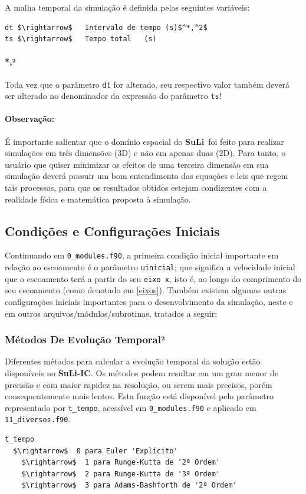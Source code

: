 \documentclass[12pt, a4paper]{article}
\newcommand{\SL}{{\bf SuLi}}
\newcommand{\SLIC}{{\bf SuLi-IC}}
\begin{document}
A malha temporal da simulação é definida pelas seguintes variáveis:
\begin{lstlisting}
dt $\rightarrow$   Intervalo de tempo (s)$^*,^2$
ts $\rightarrow$   Tempo total	 (s)
\end{lstlisting}

\paragraph{*,²} Toda vez que o parâmetro \verb|dt| for alterado, seu respectivo valor também deverá ser alterado no denominador da expressão do parâmetro \verb|ts|!

\paragraph{Observação:} É importante salientar que o domínio espacial do \SL\ foi feito para realizar simulações em três dimensões (3D) e não em apenas duas (2D). Para tanto, o usuário que quiser minimizar os efeitos de uma terceira dimensão em sua simulação deverá possuir um bom entendimento das equações e leis que regem tais processos, para que os resultados obtidos estejam condizentes com a realidade física e matemática proposta à simulação.



\subsection{Condições e Configurações Iniciais}
Continuando em \verb|0_modules.f90|, a primeira condição inicial importante em relação ao escoamento é o parâmetro \verb|uinicial|; que significa a velocidade inicial que o escoamento terá a partir do seu \verb|eixo x|, isto é, ao longo do comprimento do seu escoamento (como denotado em \ref{eixos}). Também existem algumas outras configurações iniciais importantes para o desenvolvimento da simulação, neste e em outros arquivos/módulos/subrotinas, tratados a seguir:


\subsubsection{Métodos De Evolução Temporal²}
Diferentes métodos para calcular a evolução temporal da solução estão disponíveis no \SLIC. Os métodos podem resultar em um grau menor de precisão e com maior rapidez na resolução, ou serem mais precisos, porém consequentemente mais lentos. Esta função está disponível pelo parâmetro representado por \verb|t_tempo|, acessível em \verb|0_modules.f90| e aplicado em \verb|11_diversos.f90|.
\begin{lstlisting}[escapeinside='']
t_tempo	
  $\rightarrow$  0 para Euler 'Explícito'
	$\rightarrow$  1 para Runge-Kutta de '2ª Ordem'
	$\rightarrow$  2 para Runge-Kutta de '3ª Ordem'
	$\rightarrow$  3 para Adams-Bashforth de '2ª Ordem'
\end{lstlisting}
\end{document}
